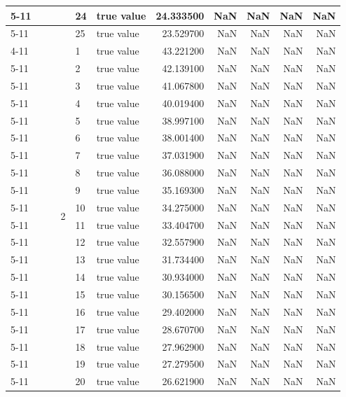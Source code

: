 \begin{tabular}{llllllrrrrr}
\cline{5-11}
 &  &  &  & 24 & true value & 24.333500 & NaN & NaN & NaN & NaN \\
\cline{5-11}
 &  &  &  & 25 & true value & 23.529700 & NaN & NaN & NaN & NaN \\
\cline{4-11} \cline{5-11}
 &  &  & \multirow[t]{25}{*}{2} & 1 & true value & 43.221200 & NaN & NaN & NaN & NaN \\
\cline{5-11}
 &  &  &  & 2 & true value & 42.139100 & NaN & NaN & NaN & NaN \\
\cline{5-11}
 &  &  &  & 3 & true value & 41.067800 & NaN & NaN & NaN & NaN \\
\cline{5-11}
 &  &  &  & 4 & true value & 40.019400 & NaN & NaN & NaN & NaN \\
\cline{5-11}
 &  &  &  & 5 & true value & 38.997100 & NaN & NaN & NaN & NaN \\
\cline{5-11}
 &  &  &  & 6 & true value & 38.001400 & NaN & NaN & NaN & NaN \\
\cline{5-11}
 &  &  &  & 7 & true value & 37.031900 & NaN & NaN & NaN & NaN \\
\cline{5-11}
 &  &  &  & 8 & true value & 36.088000 & NaN & NaN & NaN & NaN \\
\cline{5-11}
 &  &  &  & 9 & true value & 35.169300 & NaN & NaN & NaN & NaN \\
\cline{5-11}
 &  &  &  & 10 & true value & 34.275000 & NaN & NaN & NaN & NaN \\
\cline{5-11}
 &  &  &  & 11 & true value & 33.404700 & NaN & NaN & NaN & NaN \\
\cline{5-11}
 &  &  &  & 12 & true value & 32.557900 & NaN & NaN & NaN & NaN \\
\cline{5-11}
 &  &  &  & 13 & true value & 31.734400 & NaN & NaN & NaN & NaN \\
\cline{5-11}
 &  &  &  & 14 & true value & 30.934000 & NaN & NaN & NaN & NaN \\
\cline{5-11}
 &  &  &  & 15 & true value & 30.156500 & NaN & NaN & NaN & NaN \\
\cline{5-11}
 &  &  &  & 16 & true value & 29.402000 & NaN & NaN & NaN & NaN \\
\cline{5-11}
 &  &  &  & 17 & true value & 28.670700 & NaN & NaN & NaN & NaN \\
\cline{5-11}
 &  &  &  & 18 & true value & 27.962900 & NaN & NaN & NaN & NaN \\
\cline{5-11}
 &  &  &  & 19 & true value & 27.279500 & NaN & NaN & NaN & NaN \\
\cline{5-11}
 &  &  &  & 20 & true value & 26.621900 & NaN & NaN & NaN & NaN \\

\end{tabular}
